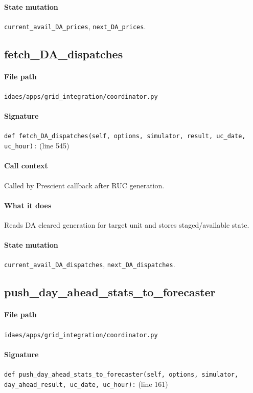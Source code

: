 \documentclass{article}
\begin{document}
\paragraph{State mutation} \texttt{current\_avail\_DA\_prices}, \texttt{next\_DA\_prices}.

\subsection{fetch\_DA\_dispatches}\label{fn:fetch_DA_dispatches}
\paragraph{File path} \texttt{idaes/apps/grid\_integration/coordinator.py}
\paragraph{Signature} \texttt{def fetch\_DA\_dispatches(self, options, simulator, result, uc\_date, uc\_hour):} (line 545)
\paragraph{Call context} Called by Prescient callback after RUC generation.
\paragraph{What it does} Reads DA cleared generation for target unit and stores staged/available state.
\paragraph{State mutation} \texttt{current\_avail\_DA\_dispatches}, \texttt{next\_DA\_dispatches}.

\subsection{push\_day\_ahead\_stats\_to\_forecaster}\label{fn:push_day_ahead_stats_to_forecaster}
\paragraph{File path} \texttt{idaes/apps/grid\_integration/coordinator.py}
\paragraph{Signature} \texttt{def push\_day\_ahead\_stats\_to\_forecaster(self, options, simulator, day\_ahead\_result, uc\_date, uc\_hour):} (line 161)
\end{document}
